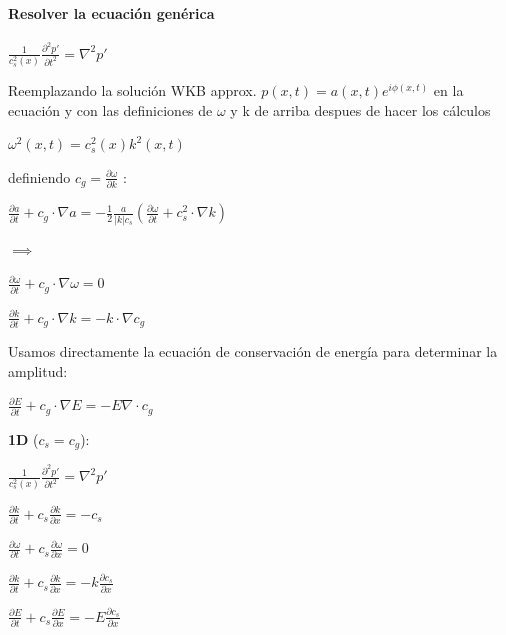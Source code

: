 \documentclass{article}
\begin{document}
\paragraph{Resolver la ecuación genérica}
\begin{description}  
\item $\frac{1}{c_s^{2}(x)} \frac{\partial^{2} p\prime}{\partial t^{2}} = \nabla^{2} p\prime    $
\item Reemplazando la solución WKB approx. $p(x,t) = a(x,t) e^{i \phi(x,t)}$ en la ecuación y con las definiciones de $\omega$ y k de arriba despues de hacer los cálculos 
\item $\omega^{2}(x,t) = c_s^{2}(x) k^2(x,t)$
\item definiendo $c_g = \frac{\partial \omega}{\partial k}$ :
\item $\frac{\partial a}{\partial t} + c_g \cdot \nabla a = -\frac{1}{2} \frac{a}{|k| c_s} (\frac{\partial \omega}{\partial t} + c_s^{2} \cdot \nabla k) $

\item $\implies $ 
\item$\frac{\partial \omega}{\partial t} + c_g \cdot \nabla \omega = 0 $
\item$\frac{\partial k}{\partial t} + c_g \cdot \nabla k = -k \cdot \nabla c_g $

\item Usamos directamente la ecuación de conservación de energía para determinar la amplitud:
\item$\frac{\partial E}{\partial t} + c_g \cdot \nabla E = -E \nabla \cdot c_g $

\end{description}


\textbf{1D} ($c_s = c_g$):
\begin{description}  
\item $\frac{1}{c_s^{2}(x)} \frac{\partial^{2} p\prime}{\partial t^{2}} = \nabla^{2} p\prime    $
\item$\frac{\partial k}{\partial t} + c_s \frac{\partial k}{\partial x} = -c_s $
\item$\frac{\partial \omega}{\partial t} + c_s \frac{\partial \omega}{\partial x} = 0 $
\item$\frac{\partial k}{\partial t} + c_s \frac{\partial k}{\partial x} = -k \frac{\partial c_s}{\partial x} $
\item$\frac{\partial E}{\partial t} + c_s \frac{\partial E}{\partial x} = -E \frac{\partial  c_s}{\partial x} $


\end{description}
\end{document}
